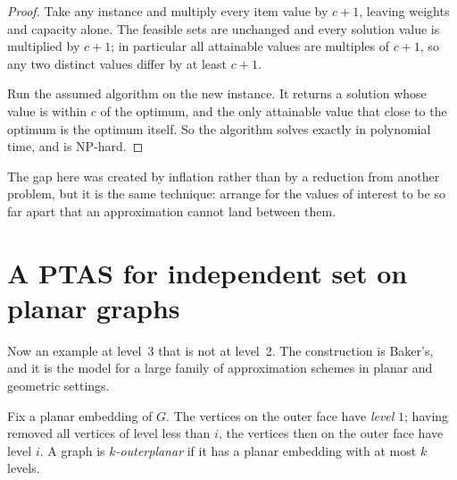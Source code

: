 \begin{proof}
Take any instance and multiply every item value by $c+1$, leaving weights and
capacity alone. The feasible sets are unchanged and every solution value is
multiplied by $c+1$; in particular all attainable values are multiples of
$c+1$, so any two distinct values differ by at least $c+1$.

Run the assumed algorithm on the new instance. It returns a solution whose value
is within $c$ of the optimum, and the only attainable value that close to the
optimum is the optimum itself. So the algorithm solves  exactly
in polynomial time, and  is \textrm{NP}-hard.
\end{proof}

The gap here was created by inflation rather than by a reduction from another
problem, but it is the same technique: arrange for the values of interest to be
so far apart that an approximation cannot land between them.

\section{A PTAS for independent set on planar graphs}
\label{sec:ptas-planar-is}

Now an example at level~3 that is not at level~2. The construction is Baker's,
and it is the model for a large family of approximation schemes in planar and
geometric settings.

\begin{definition}\label{def:k-outerplanar}
Fix a planar embedding of $G$. The vertices on the outer face have \emph{level}
$1$; having removed all vertices of level less than $i$, the vertices then on
the outer face have level $i$. A graph is \emph{$k$-outerplanar} if it has a
planar embedding with at most $k$ levels.
\end{definition}

